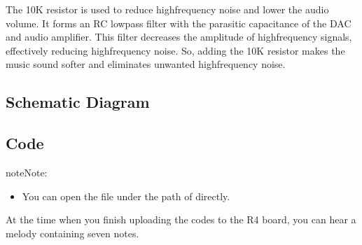 \documentclass[a4paper,11pt,english]{sphinxmanual}
\begin{document}
\sphinxAtStartPar
The 10K resistor is used to reduce high\sphinxhyphen{}frequency noise and lower the audio volume. It forms an RC low\sphinxhyphen{}pass filter with the parasitic capacitance of the DAC and audio amplifier. This filter decreases the amplitude of high\sphinxhyphen{}frequency signals, effectively reducing high\sphinxhyphen{}frequency noise. So, adding the 10K resistor makes the music sound softer and eliminates unwanted high\sphinxhyphen{}frequency noise.



\subsection{Schematic Diagram}
\label{\detokenize{Basic_Project/Audio_Module_Speaker:schematic-diagram}}


\subsection{Code}
\label{\detokenize{Basic_Project/Audio_Module_Speaker:code}}
\begin{sphinxadmonition}{note}{Note:}\begin{itemize}
\item {} 
\sphinxAtStartPar
You can open the file  under the path of  directly.

\end{itemize}
\end{sphinxadmonition}

\sphinxAtStartPar
At the time when you finish uploading the codes to the R4 board, you can hear a melody containing seven notes.
\end{document}
